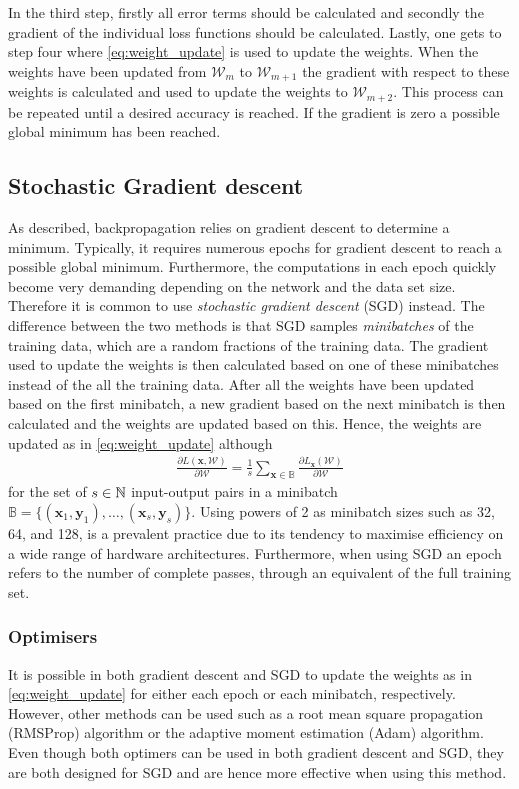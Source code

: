In the third step, firstly all error terms should be calculated and secondly the gradient of the individual loss functions should be calculated. Lastly, one gets to step four where \eqref{eq:weight_update} is used to update the weights. When the weights have been updated from $\mathcal{W}_{m}$ to $\mathcal{W}_{m+1}$ the gradient with respect to these weights is calculated and used to update the weights to $\mathcal{W}_{m+2}$. This process can be repeated until a desired accuracy is reached. If the gradient is zero a possible global minimum has been reached.


\subsection{Stochastic Gradient descent}
As described, backpropagation relies on gradient descent to determine a minimum. Typically, it requires numerous epochs for gradient descent to reach a possible global minimum. Furthermore, the computations in each epoch quickly become very demanding depending on the network and the data set size. Therefore it is common to use \emph{stochastic gradient descent} (SGD) instead. The difference between the two methods is that SGD samples \emph{minibatches} of the training data, which are a random fractions of the training data. The gradient used to update the weights is then calculated based on one of these minibatches instead of the all the training data. After all the weights have been updated based on the first minibatch, a new gradient based on the next minibatch is then calculated and the weights are updated based on this. Hence, the weights are updated as in \eqref{eq:weight_update} although
\begin{align*}
    \frac{\partial L(\bm{x}, \mathcal{W})}{\partial \mathcal{W}} =  \frac{1}{s} \sum_{\bm x \in \mathbb{B}} \frac{\partial L_{\bm{x}}(\mathcal{W})}{\partial \mathcal{W}}
\end{align*}
for the set of $s\in\mathbb{N}$ input-output pairs in a minibatch $\mathbb{B} = \{(\bm{x}_1,\bm{y}_1), \ldots, (\bm{x}_s,\bm{y}_s)\}$. Using powers of 2 as minibatch sizes such as 32, 64, and 128, is a prevalent practice due to its tendency to maximise efficiency on a wide range of hardware architectures. Furthermore, when using SGD an epoch refers to the number of complete passes, through an equivalent of the full training set.


\subsubsection{Optimisers}
It is possible in both gradient descent and SGD to update the weights as in \eqref{eq:weight_update} for either each epoch or each minibatch, respectively. However, other methods can be used such as a root mean square propagation (RMSProp) algorithm or the adaptive moment estimation (Adam) algorithm. Even though both optimers can be used in both gradient descent and SGD, they are both designed for SGD and are hence more effective when using this method.

